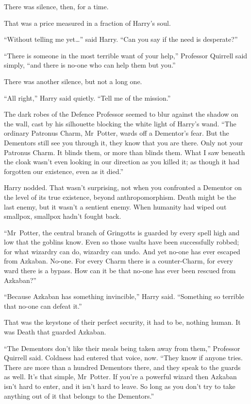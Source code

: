 There was silence, then, for a time.

That was a price measured in a fraction of Harry’s soul.

“Without telling me yet…” said Harry.
“Can you say if the need is desperate?”

“There is someone in the most terrible want of your help,” Professor Quirrell said simply, “and there is no-one who can help them but you.”

There was another silence, but not a long one.

“All right,” Harry said quietly.
“Tell me of the mission.”

The dark robes of the Defence Professor seemed to blur against the shadow on the wall, cast by his silhouette blocking the white light of Harry’s wand.
“The ordinary Patronus Charm, Mr~Potter, wards off a Dementor’s fear. But the Dementors still see you through it, they know that you are there. Only not your Patronus Charm. It blinds them, or more than blinds them. What I saw beneath the cloak wasn’t even looking in our direction as you killed it; as though it had forgotten our existence, even as it died.”

Harry nodded. That wasn’t surprising, not when you confronted a Dementor on the level of its true existence, beyond anthropomorphism. Death might be the last enemy, but it wasn’t a sentient enemy. When humanity had wiped out smallpox, smallpox hadn’t fought back.

“Mr~Potter, the central branch of Gringotts is guarded by every spell high and low that the goblins know. Even so those vaults have been successfully robbed; for what wizardry can do, wizardry can undo. And yet no-one has ever escaped from Azkaban. No-one. For every Charm there is a counter-Charm, for every ward there is a bypass. How can it be that no-one has ever been rescued from Azkaban?”

“Because Azkaban has something invincible,” Harry said.
“Something so terrible that no-one can defeat it.”

That was the keystone of their perfect security, it had to be, nothing human. It was Death that guarded Azkaban.

“The Dementors don’t like their meals being taken away from them,” Professor Quirrell said. Coldness had entered that voice, now.
“They know if anyone tries. There are more than a hundred Dementors there, and they speak to the guards as well. It’s that simple, Mr~Potter. If you’re a powerful wizard then Azkaban isn’t hard to enter, and it isn’t hard to leave. So long as you don’t try to take anything out of it that belongs to the Dementors.”


